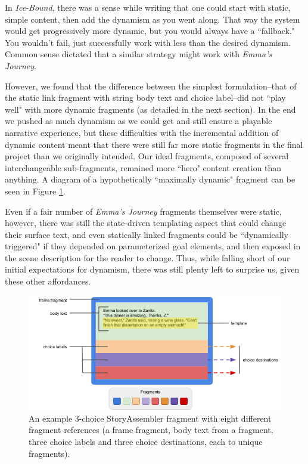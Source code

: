 
In \textit{Ice-Bound}, there was a sense while writing that one could start with static, simple content, then add the dynamism as you went along. That way the system would get progressively more dynamic, but you would always have a ``fallback." You wouldn't fail, just successfully work with less than the desired dynamism. Common sense dictated that a similar strategy might work with \textit{Emma's Journey}.

However, we found that the difference between the simplest formulation--that of the static link fragment with string body text and choice label--did not ``play well" with more dynamic fragments (as detailed in the next section). In the end we pushed as much dynamism as we could get and still ensure a playable narrative experience, but these difficulties with the incremental addition of dynamic content meant that there were still far more static fragments in the final project than we originally intended. Our ideal fragments, composed of several interchangeable sub-fragments, remained more ``hero" content creation than anything. A diagram of a hypothetically ``maximally dynamic" fragment can be seen in Figure \ref{fig:maximal-components}.

Even if a fair number of \textit{Emma's Journey} fragments themselves were static, however, there was still the state-driven templating aspect that could change their surface text, and even statically linked fragments could be ``dynamically triggered" if they depended on parameterized goal elements, and then exposed in the scene description for the reader to change. Thus, while falling short of our initial expectations for dynamism, there was still plenty left to surprise us, given these other affordances.


\begin{figure}
    \centering
    \includegraphics[width=\textwidth]{figures/3-StoryAssembler/fragment.png}
    \caption{An example 3-choice StoryAssembler fragment with eight different fragment references (a frame fragment, body text from a fragment, three choice labels and three choice destinations, each to unique fragments).}
    \label{fig:maximal-components}
\end{figure}

